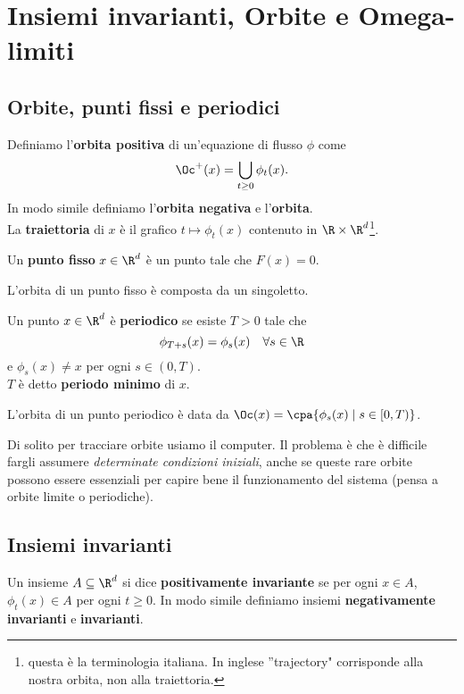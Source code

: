 \chapter{Insiemi invarianti, Orbite e Omega-limiti}

\section{Orbite, punti fissi e periodici}
\begin{definition}[Orbita]
Definiamo l'\textbf{orbita positiva} di un'equazione di flusso $\phi$ come
\[\Oc^+(x)=\bigcup_{t\geq 0}\phi_t(x).\]
In modo simile definiamo l'\textbf{orbita negativa} e l'\textbf{orbita}.\\
La \textbf{traiettoria} di $x$ \`e il grafico $t\mapsto \phi_t(x)$ contenuto in $\R\times \R^d$\footnote{questa \`e la terminologia italiana. In inglese ''trajectory" corrisponde alla nostra orbita, non alla traiettoria.}.
\end{definition}

\begin{definition}
Un \textbf{punto fisso} $x\in\R^d$ \`e un punto tale che $F(x)=0$.
\end{definition}
\begin{remark}
L'orbita di un punto fisso \`e composta da un singoletto.
\end{remark}

\begin{definition}
Un punto $x\in\R^d$ \`e \textbf{periodico} se esiste $T>0$ tale che
\[\phi_{T+s}(x)=\phi_s(x)\quad \forall s\in\R\]
e $\phi_s(x)\neq x$ per ogni $s\in (0,T)$.\\
$T$ \`e detto \textbf{periodo minimo} di $x$.
\end{definition}
\begin{remark}
L'orbita di un punto periodico \`e data da
$\Oc(x)=\cpa{\phi_s(x)\mid s\in[0,T)}$.
\end{remark}

\begin{remark}[Simulazione]
Di solito per tracciare orbite usiamo il computer. Il problema \`e che \`e difficile fargli assumere \textit{determinate condizioni iniziali}, anche se queste rare orbite possono essere essenziali per capire bene il funzionamento del sistema (pensa a orbite limite o periodiche). 
\end{remark}

\section{Insiemi invarianti}
\begin{definition}
Un insieme $A\subseteq \R^d$ si dice \textbf{positivamente invariante} se per ogni $x\in A$, $\phi_t(x)\in A$ per ogni $t\geq 0$. In modo simile definiamo insiemi \textbf{negativamente invarianti} e \textbf{invarianti}.
\end{definition}

